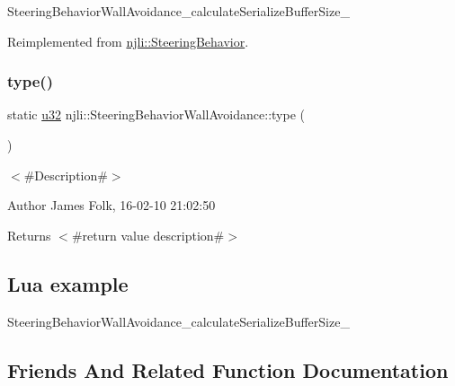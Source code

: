 \begin{DoxyCodeInclude}
\end{DoxyCodeInclude}
Steering\+Behavior\+Wall\+Avoidance\+\_\+calculate\+Serialize\+Buffer\+Size\+\_\+ 

Reimplemented from \mbox{\hyperlink{classnjli_1_1_steering_behavior_aa8494cb4a327c0040f64cfe8b393786e}{njli\+::\+Steering\+Behavior}}.

\mbox{\label{classnjli_1_1_steering_behavior_wall_avoidance_a09b82f632fc82a4a7bb076ca7c4ae47d}} 
\subsubsection{\texorpdfstring{type()}{type()}}
{\footnotesize\ttfamily static \mbox{\hyperlink{_util_8h_a10e94b422ef0c20dcdec20d31a1f5049}{u32}} njli\+::\+Steering\+Behavior\+Wall\+Avoidance\+::type (\begin{DoxyParamCaption}{ }\end{DoxyParamCaption})\hspace{0.3cm}{\ttfamily [static]}}



$<$\#\+Description\#$>$ 

\begin{DoxyAuthor}{Author}
James Folk, 16-\/02-\/10 21\+:02\+:50
\end{DoxyAuthor}
\begin{DoxyReturn}{Returns}
$<$\#return value description\#$>$
\end{DoxyReturn}
\hypertarget{classnjli_1_1_steering_behavior_wander_ex1}{}\subsection{Lua example}\label{classnjli_1_1_steering_behavior_wander_ex1}

\begin{DoxyCodeInclude}
\end{DoxyCodeInclude}
Steering\+Behavior\+Wall\+Avoidance\+\_\+calculate\+Serialize\+Buffer\+Size\+\_\+ 

\subsection{Friends And Related Function Documentation}
\mbox{\label{classnjli_1_1_steering_behavior_wall_avoidance_acb96ebb09abe8f2a37a915a842babfac}} 
